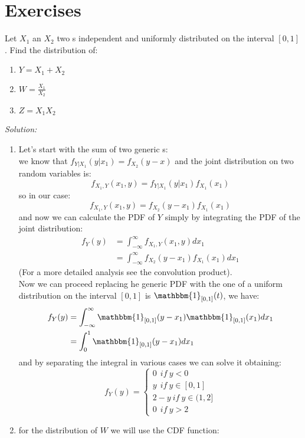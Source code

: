 \chapter{Exercises}
\label{cha:ex}
\vspace{15pt}
\begin{ex}
	Let $X_1$ an $X_2$ two \rv s independent and uniformly distributed on the interval $[0,1]$. Find the distribution of:
	\begin{enumerate}
		\item $Y=X_1+X_2$
		\item $W=\frac{X_1}{X_2}$
		\item $Z=X_1X_2$
	\end{enumerate}
	
	
	\textit{Solution:}
	\begin{enumerate}
		\item Let's start with the sum of two generic \rv s:\\
		we know that $f_{Y|X_1}(y|x_1)=f_{X_2}(y-x)$ and the joint distribution on two random variables is:
		\[
		f_{X_1,Y}(x_1,y)=f_{Y|X_1}(y|x_1)f_{X_1}(x_1)
		\]
		so in our case:
		\[
		f_{X_1,Y}(x_1,y)=f_{X_2}(y-x_1)f_{X_1}(x_1)
		\]
		and now we can calculate the PDF of $Y$ simply by integrating the PDF of the joint distribution:
		\[
		\begin{split}
		f_{Y}(y)
		&=\int_{- \infty}^{\infty}f_{X_1,Y}(x_1,y)dx_1\\
		&= \int_{- \infty}^{\infty}f_{X_2}(y-x_1)f_{X_1}(x_1)dx_1
		\end{split}
		\]
		(For a more detailed analysis see the convolution product).\\
		Now we can proceed replacing he generic PDF with the one of a uniform distribution on the interval $[0,1]$ is $\mathbbm{1}_{[0,1]}(t)$, we have:
		\[
		\begin{split}
		f_{Y}(y)
		&= \int_{- \infty}^{\infty}\mathbbm{1}_{[0,1]}(y-x_1)\mathbbm{1}_{[0,1]}(x_1)dx_1\\
		&= \int_{0}^{1}\mathbbm{1}_{[0,1]}(y-x_1)dx_1
		\end{split}
		\]
		and by separating the integral in various cases we can solve it obtaining:
		\[
		f_{Y}(y)=
		\begin{cases}
		0 \ \  if \ y < 0 \\
		y \ \  if \  y\in[0,1]\\
		2-y \ if \  y\in(1,2]\\
		0 \ \ if \  y>2
		\end{cases}
		\]
		\item for the distribution of $W$ we will use the CDF function:\\

\end{enumerate}
\end{ex}

